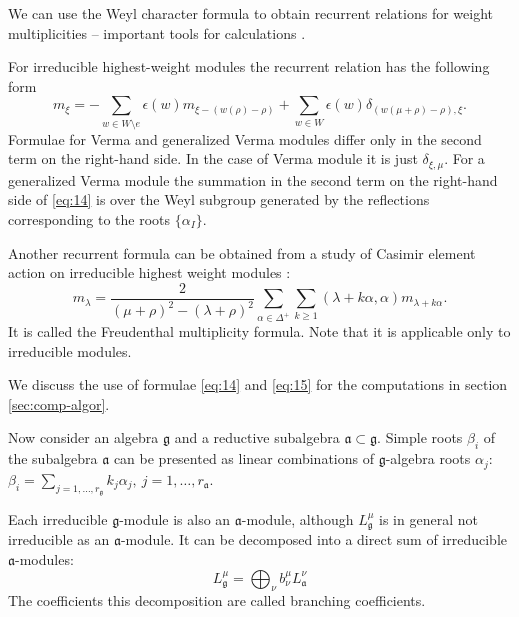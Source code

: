 \documentclass[preprint,12pt]{elsarticle}
\newcommand{\gf}{\mathfrak{g}}
\newcommand{\af}{\mathfrak{a}}
\begin{document}

We can use the Weyl character formula to obtain recurrent relations for weight multiplicities -- important tools for calculations \cite{il2010folded,kulish4sfa}. 

For irreducible highest-weight modules the recurrent relation has the following form
\begin{equation}
\label{eq:14}
m_{\xi }=-\sum_{w\in W\setminus e}\epsilon (w)m_{\xi
-\left( w(\rho )-\rho \right) }+\sum_{w\in W}\epsilon
(w)\delta _{\left( w(\mu +\rho )-\rho \right) ,\xi }.
\end{equation}
Formulae for Verma and generalized Verma modules differ only in the second term on the right-hand side. In the case of Verma module it is just $\delta_{\xi,\mu}$. For a generalized Verma module the summation in the second term on the right-hand side of \eqref{eq:14} is over the Weyl subgroup generated by the reflections corresponding to the roots $\{\alpha_{I}\}$.

Another recurrent formula can be obtained from a study of Casimir
element action on irreducible highest weight modules
\cite{humphreys1997introduction}:
\begin{equation}
  \label{eq:15}
  m_{\lambda}=\frac{2}{(\mu+\rho)^{2}-(\lambda+\rho)^{2}}\sum_{\alpha\in \Delta^{+}}\sum_{k\geq 1} (\lambda+k\alpha,\alpha)m_{\lambda+k\alpha}.
\end{equation}
It is called the Freudenthal multiplicity formula.
Note that it is applicable only to irreducible modules. 


We discuss the use of formulae \eqref{eq:14} and \eqref{eq:15} for the computations in section \ref{sec:comp-algor}. 

Now consider an algebra $\gf$ and a reductive subalgebra
$\af\subset \gf$. Simple roots $\beta_{i}$ of the subalgebra $\af$
can be presented as linear combinations of $\gf$-algebra roots
$\alpha_{j}$: $\beta_{i}=\sum_{j=1,\dots,r_{\gf}}k_{j}
\alpha_{j},\ j=1,\dots,r_{\af}$.

Each irreducible $\gf$-module is also an $\af$-module, although
$L^{\mu}_{\gf}$ is in general not irreducible as an $\af$-module. 
It can be
decomposed into a direct sum of irreducible $\af$-modules:
\begin{equation}
  \label{eq:16}
  L^{\mu}_{\gf}=\bigoplus_{\nu}b^{\mu}_{\nu}L^{\nu}_{\af}
\end{equation}
The coefficients this decomposition are called branching coefficients. 
\end{document}
